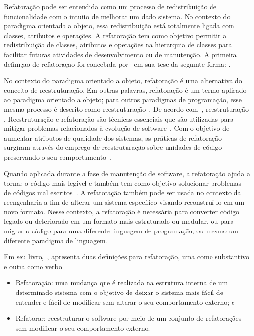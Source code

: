 Refatoração pode ser entendida como um processo de redistribuição de funcionalidade com o intuito de melhorar um dado sistema. No contexto do paradigma orientado a objeto, essa redistribuição está totalmente ligada com classes, atributos e operações. A refatoração tem como objetivo permitir a redistribuição de classes, atributos e operações na hierarquia de classes para facilitar futuras atividades de desenvolvimento ou de manutenção. A primeira definição de refatoração foi concebida por~ em sua tese da seguinte forma: .

No contexto do paradigma orientado a objeto, refatoração é uma alternativa do conceito de reestruturação. Em outras palavras, refatoração é um termo aplicado ao paradigma orientado a objeto; para outros paradigmas de programação, esse mesmo processo é descrito como reestruturação~\cite{Chikofsky_cross}. De acordo com~, reestruturação . Reestruturação e refatoração são técnicas essenciais que são utilizadas para mitigar problemas relacionados à evolução de software~\cite{OPDYKE_1992}. Com o objetivo de aumentar atributos de qualidade dos sistemas, as práticas de refatoração surgiram através do emprego de reestruturação sobre unidades de código preservando o seu comportamento~\cite{Chikofsky_cross,OPDYKE_1992}.

Quando aplicada durante a fase de manutenção de software, a refatoração ajuda a tornar o código mais legível e também tem como objetivo solucionar problemas de códigos mal escritos~\cite{Chikofsky_cross}. A refatoração também pode ser usada no contexto da reengenharia a fim de alterar um sistema específico visando reconstruí-lo em um novo formato. Nesse contexto, a refatoração é necessária para converter código legado ou deteriorado em um formato mais estruturado ou modular, ou para migrar o código para uma diferente linguagem de programação, ou mesmo um diferente paradigma de linguagem.

Em seu livro,~, apresenta duas definições para refatoração, uma como substantivo e outra como verbo:

\begin{itemize}
	\item Refatoração: uma mudança que é realizada na estrutura interna de um determinado sistema com o objetivo de deixar o sistema mais fácil de entender e fácil de modificar sem alterar o seu comportamento externo; e
	\item Refatorar: reestruturar o software por meio de um conjunto de refatorações sem modificar o seu comportamento externo.
\end{itemize}


